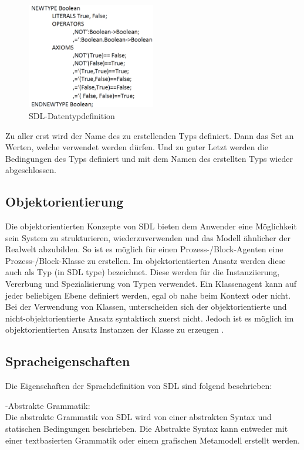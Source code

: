\begin{figure}[h]
	\centering
	\includegraphics[width=0.5\textwidth]{Graphics/Data.png}
	\caption{SDL-Datentypdefinition}
	\label{fig:DatentypDef}
\end{figure}

Zu aller erst wird der Name des zu erstellenden Typs definiert. Dann das Set an Werten, welche verwendet werden dürfen. Und zu guter Letzt werden die Bedingungen des Typs definiert und mit dem Namen des erstellten Typs wieder abgeschlossen.

\pagebreak
\subsection{Objektorientierung} 
\label{ssc:Vererbung}
Die objektorientierten Konzepte von \ac{SDL} bieten dem Anwender eine Möglichkeit sein System zu strukturieren, wiederzuverwenden und das Modell ähnlicher der Realwelt abzubilden. So ist es möglich für einen Prozess-/Block-Agenten eine Prozess-/Block-Klasse zu erstellen. Im objektorientierten Ansatz werden diese auch als Typ (in \ac{SDL} type) bezeichnet. Diese werden für die Instanziierung, Vererbung und Spezialisierung von Typen verwendet. Ein Klassenagent kann auf jeder beliebigen Ebene definiert werden, egal ob nahe beim Kontext oder nicht.
Bei der Verwendung von Klassen, unterscheiden sich der objektorientierte und nicht-objektorientierte Ansatz syntaktisch zuerst nicht. Jedoch ist es möglich im objektorientierten Ansatz Instanzen der Klasse zu erzeugen \cite[4\psqq]{ITUT100_2016}.

\subsection{Spracheigenschaften}
\label{ssc:Spracheigenschaften}
Die Eigenschaften der Sprachdefinition von \ac{SDL} sind folgend beschrieben\cite[2\psq]{ITUT111_2016}:

-Abstrakte Grammatik:\\
Die abstrakte Grammatik von \ac{SDL} wird von einer abstrakten Syntax und statischen Bedingungen 
beschrieben. Die Abstrakte Syntax kann entweder mit einer textbasierten Grammatik oder einem grafischen Metamodell erstellt werden.
		
